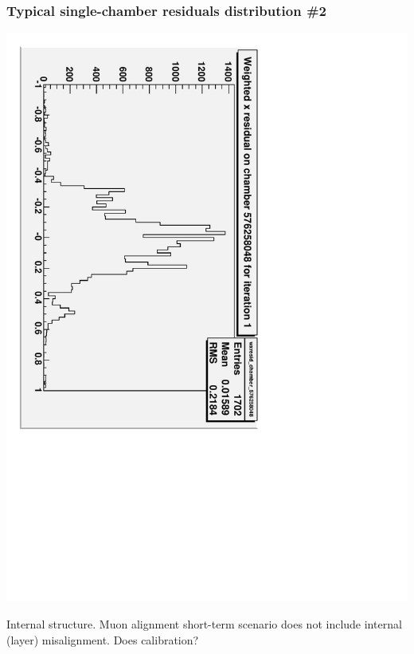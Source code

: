 \documentclass[compress]{beamer}
\begin{document}
\begin{frame}
\frametitle{Typical single-chamber residuals distribution \#2}
\begin{center}
\includegraphics[height=0.7\linewidth, angle=90]{typical2_short_deweight_outin.pdf}
\end{center}

\vfill Internal structure.  Muon alignment short-term scenario does
not include internal (layer) misalignment.  Does calibration?
\end{frame}
\end{document}
